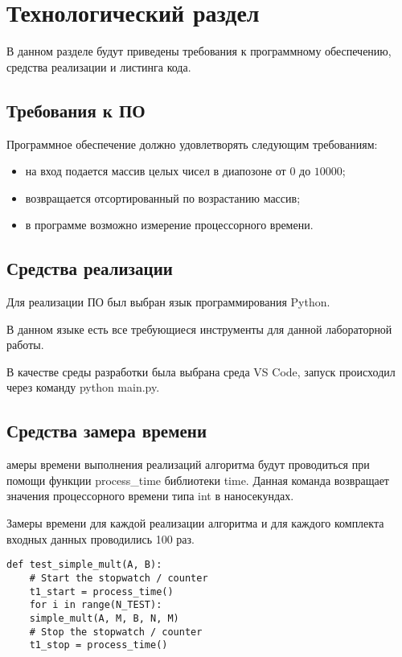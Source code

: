 \chapter{Технологический раздел}

В данном разделе будут приведены требования к программному обеспечению, средства реализации и листинга кода.

\section{Требования к ПО}

Программное обеспечение должно удовлетворять следующим требованиям:
\begin{itemize}
	\item на вход подается массив целых чисел в диапозоне от $0$ до $10000$;
	\item возвращается отсортированный по возрастанию массив;
	\item в программе возможно измерение процессорного времени.
\end{itemize}

\section{Средства реализации} 
Для реализации ПО был выбран язык программирования Python\cite{python}. 

В данном языке есть все требующиеся инструменты для данной лабораторной работы.

В качестве среды разработки была выбрана среда VS Code\cite{vscode}, запуск происходил через команду python main.py.

\section{Средства замера времени}

амеры времени выполнения реализаций алгоритма будут проводиться при помощи функции process\_time \cite{test} библиотеки time. Данная команда возвращает значения процессорного времени типа int в наносекундах.

Замеры времени для каждой реализации алгоритма и для каждого комплекта входных данных проводились 100 раз.
\newpage
\begin{lstlisting}[label=bench,caption=Пример замера затраченного времени]
	def test_simple_mult(A, B):
	# Start the stopwatch / counter 
	t1_start = process_time() 
	for i in range(N_TEST):
	simple_mult(A, M, B, N, M)
	# Stop the stopwatch / counter
	t1_stop = process_time()
\end{lstlisting}



